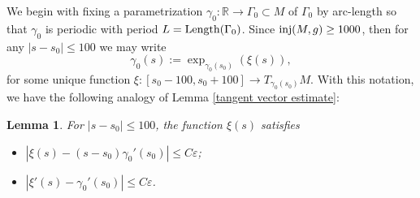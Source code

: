 \documentclass[a4paper, reqno]{amsart}
\newtheorem{lemma}[theorem]{Lemma}
\theoremstyle{definition}
\theoremstyle{remark}
\numberwithin{equation}{section}
\newcommand{\Len}{\textup{Length}}
\newcommand{\inj}{\textup{inj}}
\numberwithin{equation}{section}
\numberwithin{equation}{section}
\begin{document}
 We begin with fixing a parametrization $\gamma_0:\mathbb{R}\to\Gamma_0\subset M$ of $\Gamma_0$ by arc-length so that $\gamma_0$ is periodic with period $L = \Len(\Gamma_0)$. Since $\inj(M,g)\geq 1000$, then for any $|s-s_0|\leq 100$ we may write
 \[ \gamma_0(s) := \exp_{\gamma_0(s_0)}(\xi(s)),\]
 for some unique function $\xi: [s_0 - 100, s_0 + 100]\to T_{\gamma_0(s_0)}M$. With this notation, we have the following analogy of Lemma \ref{tangent vector estimate}:
\bigskip

\begin{lemma}{\label{tangent vector estimate M}}
For $|s-s_0|\leq 100$, the function $\xi(s)$ satisfies
	\begin{itemize}
		\item[(i)]	$|\xi(s) - (s-s_0)\gamma_0'(s_0)|\leq C\varepsilon$;
		\item[(ii)] $|\xi'(s) - \gamma_0'(s_0)| \leq C\varepsilon$.
	\end{itemize}
\end{lemma}
\end{document}

